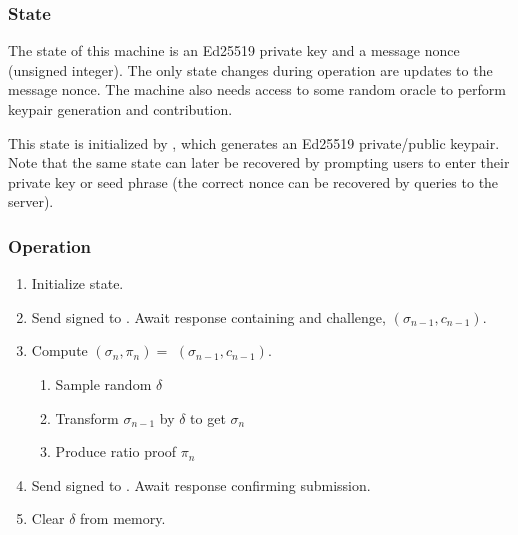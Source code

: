 \subsubsection*{State}
The state of this machine is an Ed25519 private key and a message nonce (unsigned integer). The only state changes during operation are updates to the message nonce. The machine also needs access to some random oracle to perform keypair generation and contribution.

This state is initialized by \generatekeypair{}, which generates an Ed25519 private/public keypair. Note that the same state can later be recovered by prompting users to enter their private key or seed phrase (the correct nonce can be recovered by queries to the server).

\subsubsection*{Operation}

\begin{enumerate}
    \item Initialize state.
    \item Send signed \QueryRequest{} to \Coordinator{}. Await response containing \MpcState{} and challenge, $(\sigma_{n-1}, c_{n-1})$.
    \item Compute $(\sigma_n, \pi_n) = $ \contribute{}$(\sigma_{n-1}, c_{n-1})$.
    \begin{enumerate}
        \item Sample random $\delta$
        \item Transform $\sigma_{n-1}$ by $\delta$ to get $\sigma_n$
        \item Produce ratio proof $\pi_n$ 
    \end{enumerate}
    \item Send signed \UpdateRequest{} to \Coordinator{}. Await response confirming submission.
    \item Clear $\delta$ from memory.
\end{enumerate}

